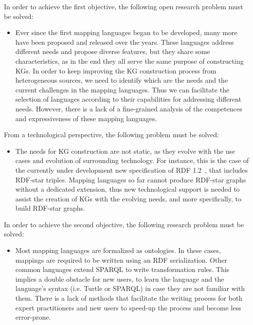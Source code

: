 In order to achieve the first objective, the following open research problem must be solved:
\begin{itemize}
    \item Ever since the first mapping languages began to be developed, many more have been proposed and released over the years. These languages address different needs and propose diverse features, but they share some characteristics, as in the end they all serve the same purpose of constructing KGs. In order to keep improving the KG construction process from heterogeneous sources, we need to identify which are the needs and the current challenges in the mapping languages. Thus we can facilitate the selection of languages according to their capabilities for addressing different needs. However, there is a lack of a fine-grained analysis of the competences and expressiveness of these mapping languages. %
\end{itemize}

From a technological perspective, the following problem must be solved:
\begin{itemize}
    \item The needs for KG construction are not static, as they evolve with the use cases and evolution of surrounding technology. For instance, this is the case of the currently under development new specification of RDF 1.2~\parencite{hartig2023rdf}, that includes RDF-star triples. Mapping languages so far cannot produce RDF-star graphs without a dedicated extension, thus new technological support is needed to assist the creation of KGs with the evolving needs, and more specifically, to build RDF-star graphs. 
\end{itemize}

In order to achieve the second objective, the following research problem must be solved:
\begin{itemize}
    \item Most mapping languages are formalized as ontologies. In these cases, mappings are required to be written using an RDF serialization. Other common languages extend SPARQL to write transformation rules. This implies a double obstacle for new users, to learn the language and the language's syntax (i.e. Turtle or SPARQL) in case they are not familiar with them. There is a lack of methods that facilitate the writing process for both expert practitioners and new users to speed-up the process and become less error-prone.
    
\end{itemize}

